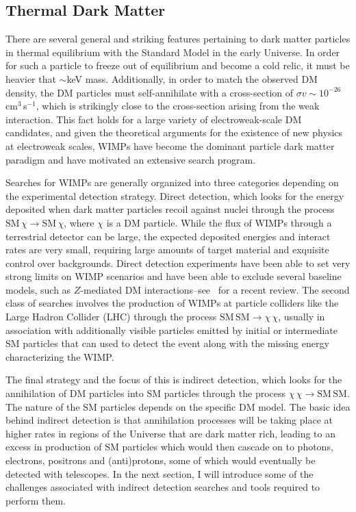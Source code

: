 \subsection{Thermal Dark Matter}

There are several general and striking features pertaining to dark matter particles in thermal equilibrium with the Standard Model in the early Universe. In order for such a particle to freeze out of equilibrium and become a cold relic, it must be heavier that $\sim$keV mass. Additionally, in order to match the observed DM density, the DM particles must self-annihilate with a cross-section of $\sigma v\sim 10^{-26}$\,cm$^3$\,s$^{-1}$, which is strikingly close to the cross-section arising from the weak interaction. This fact holds for a large variety of electroweak-scale DM candidates, and given the theoretical arguments for the existence of new physics at electroweak scales, WIMPs have become the dominant particle dark matter paradigm and have motivated an extensive search program.

Searches for WIMPs are generally organized into three categories depending on the experimental detection strategy. Direct detection, which looks for the energy deposited when dark matter particles recoil against nuclei through the process $\text{SM}\,\chi\rightarrow\text{SM}\,\chi$, where $\chi$ is a DM particle. While the flux of WIMPs through a terrestrial detector can be large, the expected deposited energies and interact rates are very small, requiring large amounts of target material and exquisite control over backgrounds. Direct detection experiments have been able to set very strong limits on WIMP scenarios and have been able to exclude several baseline models, such as $Z$-mediated DM interactions--see~\cite{} for a recent review. The second class of searches involves the production of WIMPs at particle colliders like the Large Hadron Collider (LHC) through the process $\mathrm{SM}\,\mathrm{SM}\rightarrow\chi\,\chi$, usually in association with additionally visible particles emitted by initial or intermediate SM particles that can used to detect the event along with the missing energy characterizing the WIMP. 

The final strategy and the focus of this is indirect detection, which looks for the annihilation of DM particles into SM particles through the process $\chi\,\chi\rightarrow\mathrm{SM}\,\mathrm{SM}$. The nature of the SM particles depends on the specific DM model. The basic idea behind indirect detection is that annihilation processes will be taking place at higher rates in regions of the Universe that are dark matter rich, leading to an excess in production of SM particles which would then cascade on to photons, electrons, positrons and (anti)protons, some of which would eventually be detected with telescopes. In the next section, I will introduce some of the challenges associated with indirect detection searches and tools required to perform them. 

